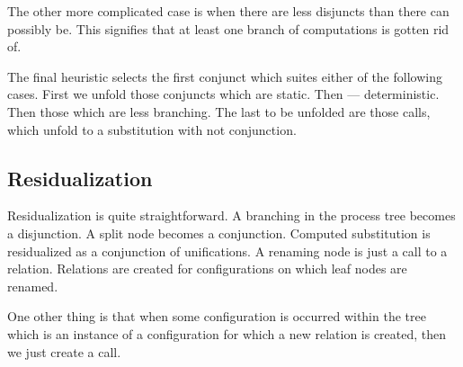 The other more complicated case is when there are less disjuncts than there can possibly be.
This signifies that at least one branch of computations is gotten rid of.

The final heuristic selects the first conjunct which suites either of the following cases.
First we unfold those conjuncts which are static.
Then --- deterministic.
Then those which are less branching.
The last to be unfolded are those calls, which unfold to a substitution with not conjunction.

\subsection{Residualization}

Residualization is quite straightforward.
A branching in the process tree becomes a disjunction.
A split node becomes a conjunction.
Computed substitution is residualized as a conjunction of unifications.
A renaming node is just a call to a relation.
Relations are created for configurations on which leaf nodes are renamed.

One other thing is that when some configuration is occurred within the tree which is an instance of a configuration for which a new relation is created, then we just create a call.
